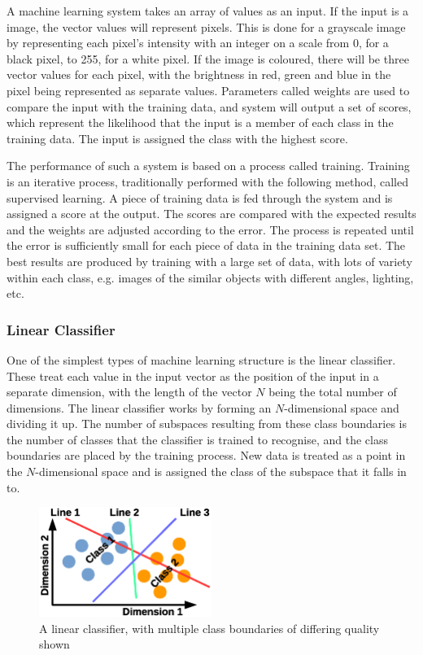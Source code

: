 \documentclass[12pt]{article}
\begin{document}
A machine learning system takes an array of values as an input. If the input is a image, the vector values will represent pixels. This is done for a grayscale image by representing each pixel's intensity with an integer on a scale from 0, for a black pixel, to 255, for a white pixel. If the image is coloured, there will be three vector values for each pixel, with the brightness in red, green and blue in the pixel being represented as separate values. Parameters called weights are used to compare the input with the training data, and system will output a set of scores, which represent the likelihood that the input is a member of each class in the training data. The input is assigned the class with the highest score. 

The performance of such a system is based on a process called training.  Training is an iterative process, traditionally performed with the following method, called supervised learning. A piece of training data is fed through the system and is assigned a score at the output. The scores are compared with the expected results and the weights are adjusted according to the error. The process is repeated until the error is sufficiently small for each piece of data in the training data set. The best results are produced by training with a large set of data, with lots of variety within each class, e.g. images of the similar objects with different angles, lighting, etc.

\subsubsection{Linear Classifier}
\label{sec:Background-ML-LC}

One of the simplest types of machine learning structure is the linear classifier. These treat each value in the input vector as the position of the input in a separate dimension, with the length of the vector $N$ being the total number of dimensions. The linear classifier works by forming an $N$-dimensional space and dividing it up. The number of subspaces resulting from these class boundaries is the number of classes that the classifier is trained to recognise, and the class boundaries are placed by the training process. New data is treated as a point in the $N$-dimensional space and is assigned the class of the subspace that it falls in to.

\begin{figure}[h]
\centering
\includegraphics[width=0.5\textwidth]{figures/SVM.eps}
\caption{A linear classifier, with multiple class boundaries of differing quality shown}
\label{fig:SVM}
\end{figure}
\end{document}
